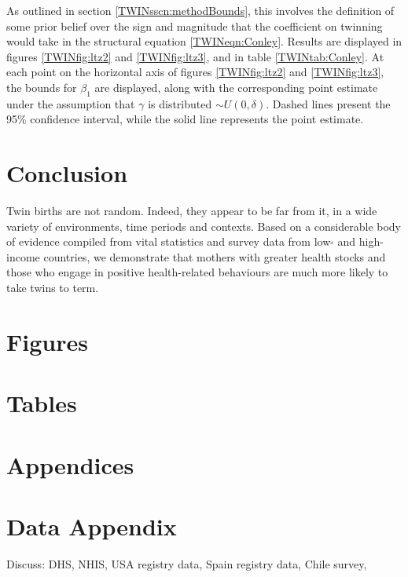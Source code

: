 \documentclass[subeqn]{article}
\begin{document}
\begin{spacing}{1.4}
As outlined in section \ref{TWINsscn:methodBounds}, this involves the definition 
of some prior belief over the sign and magnitude that the coefficient on 
twinning would take in the structural equation \ref{TWINeqn:Conley}. Results 
are displayed in figures \ref{TWINfig:ltz2} and \ref{TWINfig:ltz3}, and in 
table \ref{TWINtab:Conley}. At each point on the horizontal axis of figures 
\ref{TWINfig:ltz2} and \ref{TWINfig:ltz3}, the bounds for $\beta_1$ are 
displayed, along with the corresponding point estimate under the assumption 
that $\gamma$ is distributed $\sim U(0,\delta)$. Dashed lines present the 95\% 
confidence interval, while the solid line represents the point estimate.


\section{Conclusion}                               \label{TWINscn:conclusion}
Twin births are not random.  Indeed, they appear to be far from it, in a wide
variety of environments, time periods and contexts.  Based on a considerable 
body of evidence compiled from vital statistics and survey data from low- and 
high-income countries, we demonstrate that mothers with greater health stocks 
and those who engage in positive health-related behaviours are much more likely 
to take twins to term.  

\newpage
\section*{Figures}


\clearpage
\section*{Tables}

\clearpage




\newpage
\appendix
\section*{Appendices}
\section{Data Appendix}
Discuss: DHS, NHIS, USA registry data, Spain registry data, Chile survey, 

\newpage
\end{spacing}
\end{document}
